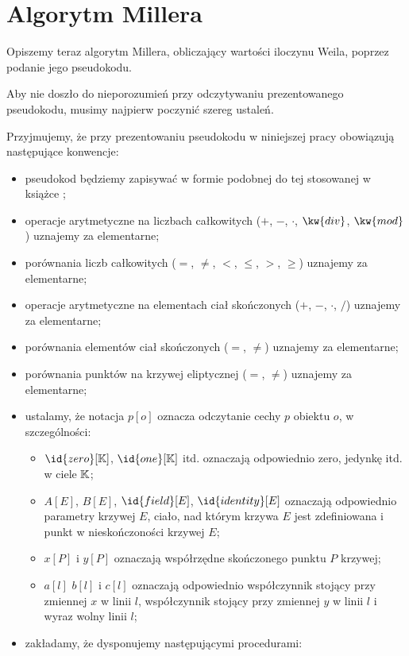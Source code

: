 \section{Algorytm Millera}

Opiszemy teraz algorytm Millera,
obliczający wartości iloczynu Weila,
poprzez podanie jego pseudokodu.

Aby nie doszło do nieporozumień przy odczytywaniu
prezentowanego pseudokodu,
musimy najpierw poczynić szereg ustaleń.

\begin{remark}
Przyjmujemy, że przy prezentowaniu pseudokodu w niniejszej pracy
obowiązują następujące konwencje:
\begin{itemize}
\item pseudokod będziemy zapisywać w formie podobnej do tej
stosowanej w książce \cite{clrs};
\item operacje arytmetyczne na liczbach całkowitych
($+$, $-$, $\cdot$, $\kw{div}$, $\kw{mod}$)
uznajemy za elementarne;
\item porównania liczb całkowitych
($=$, $\neq$, $<$, $\leq$, $>$, $\geq$)
uznajemy za elementarne;
\item operacje arytmetyczne na elementach ciał skończonych
($+$, $-$, $\cdot$, $/$)
uznajemy za elementarne;
\item porównania elementów ciał skończonych
($=$, $\neq$)
uznajemy za elementarne;
\item porównania punktów na krzywej eliptycznej
($=$, $\neq$)
uznajemy za elementarne;
\item ustalamy, że notacja $p[o]$ oznacza odczytanie cechy $p$ obiektu $o$,
w szczególności:
\begin{itemize}
\item $\id{zero}[\K]$, $\id{one}[\K]$ itd.
oznaczają odpowiednio
zero, jedynkę itd. w ciele $\mathbb{K}$;
\item $A[E]$, $B[E]$, $\id{field}[E]$, $\id{identity}[E]$
oznaczają odpowiednio
parametry krzywej $E$, ciało, nad którym krzywa $E$ jest zdefiniowana
i punkt w nieskończoności krzywej $E$;
\item $x[P]$ i $y[P]$ oznaczają współrzędne skończonego punktu $P$ krzywej;
\item $a[l]$ $b[l]$ i $c[l]$ oznaczają odpowiednio
współczynnik stojący przy zmiennej $x$ w linii $l$,
współczynnik stojący przy zmiennej $y$ w linii $l$
i wyraz wolny linii $l$;
\end{itemize}
\item zakładamy, że dysponujemy następującymi procedurami:

\end{itemize}
\end{remark}
